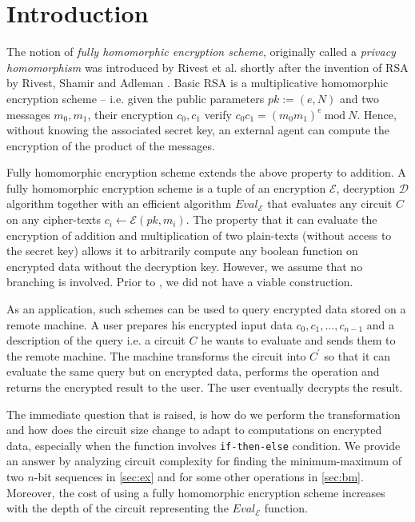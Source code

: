 \documentclass{acm_proc_article-sp}
\begin{document}

\section{Introduction}

The notion of \textit{fully homomorphic encryption scheme}, originally called a \textit{privacy homomorphism} was introduced by Rivest et al. \cite{rivest78} shortly after the invention of RSA by Rivest, Shamir and Adleman \cite{Rivest78amethod}.  Basic RSA is a multiplicative homomorphic encryption scheme -- i.e. given the public parameters $pk:=(e, N)$ and two messages $m_0, m_1$, their encryption $c_0, c_1$ verify $c_0c_1=(m_0m_1)^e \ \textrm {mod}\ N$. Hence, without knowing the associated secret key, an external agent can compute the encryption of the product of the messages.

Fully homomorphic encryption scheme extends the above property to addition. A fully homomorphic encryption scheme is a tuple of an encryption $\mathcal{E}$, decryption $\mathcal{D}$ algorithm together with an efficient algorithm $Eval_\mathcal{E}$ that evaluates any circuit $C$ on any cipher-texts $c_i \leftarrow \mathcal{E}(pk, m_i)$. The property that it can evaluate the encryption of addition and multiplication of two plain-texts (without access to the secret key) allows it to arbitrarily compute any boolean function on encrypted data without the decryption key. However, we assume that no branching is involved. Prior to \cite{homenc}, we did not have a viable construction.

As an application, such schemes can be used to query encrypted data stored on a remote machine. A user prepares his encrypted input data $c_0, c_1, \ldots, c_{n-1}$  and a description of the query i.e. a circuit $C$ he wants to evaluate and sends them to the remote machine. The machine transforms the circuit into $C^{'}$ so that it can evaluate the same query but on encrypted data, performs the operation and returns the encrypted result to the user. The user eventually decrypts the result. 

The immediate question that is raised, is how do we perform the transformation and how does the circuit size change to adapt to computations on encrypted data, especially when the function involves \texttt{if-then-else} condition. We provide an answer by analyzing circuit complexity for finding the minimum-maximum of two $n$-bit sequences in \autoref{sec:ex} and for some other operations in \autoref{sec:bm}. Moreover, the cost of using a fully homomorphic encryption scheme increases with the depth of the circuit representing the $Eval_{\mathcal{E}}$ function. 
\end{document}
